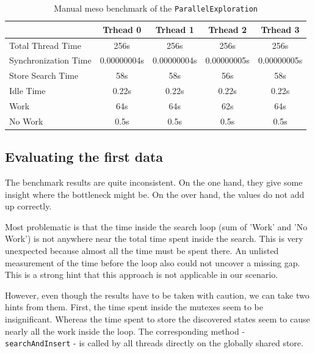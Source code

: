 \begin{center}
    \begin{table}[H]
        \centering
        \begin{tabular}{ | l | c | c | c | c |}
            \hline
            \textbf{} & \textbf{Trhead 0} & \textbf{Trhead 1} & \textbf{Trhead 2} & \textbf{Trhead 3}\\ \hline
            Total Thread Time & 256s & 256s & 256s & 256s \\ 
            Synchronization Time & 0.00000004s & 0.00000004s & 0.00000005s & 0.00000005s \\
            Store Search Time & 58s & 58s & 56s & 58s \\ 
            Idle Time & 0.22s & 0.22s & 0.22s & 0.22s \\ 
            Work & 64s & 64s & 62s & 64s \\ 
            No Work & 0.5s & 0.5s & 0.5s & 0.5s \\ \hline
        \end{tabular}
        \caption{Manual meso benchmark of the \texttt{ParallelExploration}}
        \label{ManualBenchmark}
    \end{table}
\end{center}

\subsection{Evaluating the first data}
The benchmark results are quite inconsistent. On the one hand, they give some insight where the bottleneck might be. On the over hand, the values do not add up correctly.

Most problematic is that the time inside the search loop (sum of 'Work' and 'No Work') is not anywhere near the total time spent inside the search. This is very unexpected because almost all the time must be spent there. An unlisted measurement of the time before the loop also could not uncover a missing gap. This is a strong hint that this approach is not applicable in our scenario.

However, even though the results have to be taken with caution, we can take two hints from them. First, the time spent inside the mutexes seem to be insignificant. Whereas the time spent to store the discovered states seem to cause nearly all the work inside the loop. The corresponding method - \texttt{searchAndInsert} - is called by all threads directly on the globally shared store.

